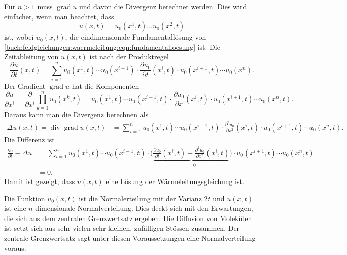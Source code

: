 Für $n>1$ muss $\operatorname{grad}u$ und davon die Divergenz
berechnet werden.
Dies wird einfacher, wenn man beachtet, dass
\[
u(x,t)
=
u_0(x^1,t)
\dots
u_0(x^2,t)
\]
ist, wobei $u_0(x,t)$, die eindimensionale Fundamentallösung
von \eqref{buch:feldgleichungen:waermeleitung:eqn:fundamentalloesung}
ist.
Die Zeitableitung von $u(x,t)$ ist nach der Produktregel
\[
\frac{\partial u}{\partial t}(x,t)
=
\sum_{i=1}^n
u_0(x^1,t)\cdots u_0(x^{i-1})
\cdot
\frac{\partial u_0}{\partial t}(x^i,t)
\cdot
u_0(x^{i+1},t)\cdots u_0(x^n).
\]
Der Gradient $\operatorname{grad}u$ hat die Komponenten
\[
\frac{\partial u}{\partial x^i}
=
\frac{\partial}{\partial x^i}
\prod_{k=1}^n
u_0(x^k,t)
=
u_0(x^1,t)\cdots u_0(x^{i-1},t)
\cdot
\frac{\partial u_0}{\partial x}(x^i,t)
\cdot
u_0(x^{i+1},t) \cdots u_0(x^n,t).
\]
Daraus kann man die Divergenz berechnen als
\begin{align*}
\Delta u(x,t)
=
\operatorname{div}
\operatorname{grad}
u(x,t)
&=
\sum_{i=1}^n
u_0(x^1,t)\cdots u_0(x^{i-1},t)
\cdot
\frac{\partial^2 u_0}{\partial x^2}(x^i,t)
\cdot
u_0(x^{i+1},t) \cdots u_0(x^n,t).
\end{align*}
Die Differenz ist
\begin{align*}
\frac{\partial u}{\partial t}
-
\Delta u
&=
\sum_{i=1}^n
u_0(x^1,t)\cdots u_0(x^{i-1},t)
\cdot
\biggl(
\underbrace{
\frac{\partial u_0}{\partial t}(x^i,t)
-
\frac{\partial^2 u_0}{\partial x^2}(x^i,t)
}_{\displaystyle = 0}
\biggr)
\cdot
u_0(x^{i+1},t) \cdots u_0(x^n,t)
\\
&=
0.
\end{align*}
Damit ist gezeigt, dass $u(x,t)$ eine Lösung der Wärmeleitungsgleichung
ist.

Die Funktion $u_0(x,t)$ ist die Normalerteilung mit der Varianz $2t$ und
$u(x,t)$ ist eine $n$-dimensionale Normalverteilung.
Dies deckt sich mit den Erwartungen, die sich aus dem zentralen
Grenzwertsatz ergeben.
Die Diffusion von Molekülen ist setzt sich aus sehr vielen sehr
kleinen, zufälligen Stössen zusammen.
Der zentrale Grenzwertsatz sagt unter diesen Voraussetzungen eine
Normalverteilung voraus.
